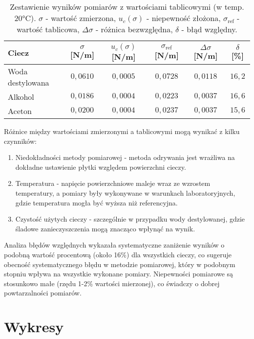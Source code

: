 \documentclass[a4paper,12pt]{article}
\begin{document}
\begin{table}[H]
    \centering
    \begin{tabular}{|l|c|c|c|c|c|}
        \hline
        \textbf{Ciecz} & \textbf{$\sigma$ [N/m]} & \textbf{$u_c(\sigma)$ [N/m]} & \textbf{$\sigma_{\text{ref}}$ [N/m]} & \textbf{$\Delta\sigma$ [N/m]} & \textbf{$\delta$ [\%]} \\
        \hline
        Woda destylowana & $0{,}0610$ & $0{,}0005$ & $0{,}0728$ & $0{,}0118$ & $16{,}2$ \\
        \hline
        Alkohol & $0{,}0186$ & $0{,}0004$ & $0{,}0223$ & $0{,}0037$ & $16{,}6$ \\
        \hline
        Aceton & $0{,}0200$ & $0{,}0004$ & $0{,}0237$ & $0{,}0037$ & $15{,}6$ \\
        \hline
    \end{tabular}
    \caption{Zestawienie wyników pomiarów z wartościami tablicowymi (w temp. 20°C). $\sigma$ - wartość zmierzona, $u_c(\sigma)$ - niepewność złożona, $\sigma_{\text{ref}}$ - wartość tablicowa, $\Delta\sigma$ - różnica bezwzględna, $\delta$ - błąd względny.}
    \label{tab:wyniki_koncowe}
\end{table}

Różnice między wartościami zmierzonymi a tablicowymi mogą wynikać z kilku czynników:

\begin{enumerate}
    \item Niedokładności metody pomiarowej - metoda odrywania jest wrażliwa na dokładne ustawienie płytki względem powierzchni cieczy.
    \item Temperatura - napięcie powierzchniowe maleje wraz ze wzrostem temperatury, a pomiary były wykonywane w warunkach laboratoryjnych, gdzie temperatura mogła być wyższa niż referencyjna.
    \item Czystość użytych cieczy - szczególnie w przypadku wody destylowanej, gdzie śladowe zanieczyszczenia mogą znacząco wpłynąć na wynik.
\end{enumerate}

Analiza błędów względnych wykazała systematyczne zaniżenie wyników o podobną wartość procentową (około 16\%) dla wszystkich cieczy, co sugeruje obecność systematycznego błędu w metodzie pomiarowej, który w podobnym stopniu wpływa na wszystkie wykonane pomiary. Niepewności pomiarowe są stosunkowo małe (rzędu 1-2\% wartości mierzonej), co świadczy o dobrej powtarzalności pomiarów.

\section{Wykresy}



\end{document}
